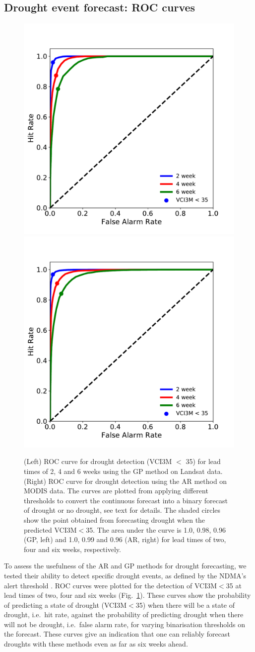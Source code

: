 \documentclass[review]{elsarticle}
\begin{document}
\subsection{Drought event forecast: ROC curves}



\begin{figure}%
	\centering
	\includegraphics[trim = 20mm 4mm 12mm 3mm,width=5.6 cm]{figures/VCIROC_Landsat.pdf}
	\qquad
	\includegraphics[trim = 12mm 4mm 20mm 3mm,width=5.6 cm]{figures/VCIROC_MODIS.pdf}
	\caption{(Left) ROC curve for drought detection (VCI3M $<$ 35) for lead times of 2, 4 and 6 weeks using the GP method on Landsat data. (Right) ROC curve for drought detection using the AR method on MODIS data. The curves are plotted from applying different thresholds to convert the continuous forecast into a binary forecast of drought or no drought, see text for details. The shaded circles show the point obtained from forecasting drought when the predicted VCI3M$<$35. The area under the curve is 1.0, 0.98, 0.96 (GP, left) and 1.0, 0.99 and 0.96 (AR, right) for lead times of two, four and six weeks, respectively. }
	\label{fig:ROC_abb}
\end{figure}





To assess the usefulness of the AR and GP methods for drought forecasting, we tested their ability to detect specific drought events, as defined by the NDMA's alert threshold \citep[VCI3M$<$35,][]{rs8040267}. ROC curves were plotted for the detection of VCI3M$<$35 at lead times of two, four and six weeks (Fig.~\ref{fig:ROC_abb}). These curves show the probability of predicting a state of drought (VCI3M$<$35) when there will be a state of drought, i.e.~hit rate, against the probability of predicting drought when there will not be drought, i.e.~false alarm rate, for varying binarisation thresholds on the forecast. These curves give an indication that one can reliably forecast droughts with these methods even as far as six weeks ahead. 
\end{document}
